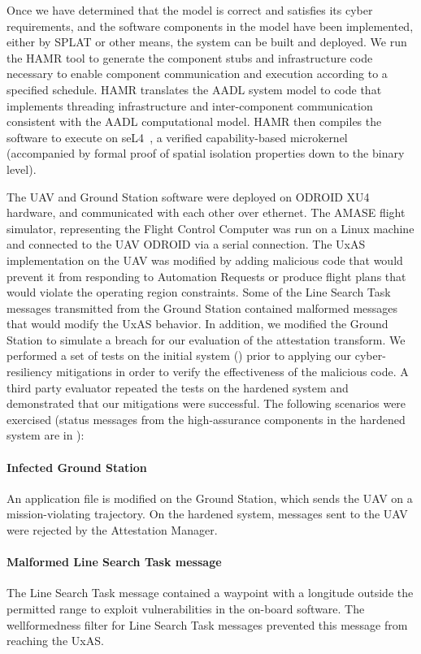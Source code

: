 Once we have determined that the model is correct and satisfies its cyber requirements, and the software components in the model have been implemented, either by SPLAT or other means, the system can be built and deployed.  We run the HAMR tool to generate the component stubs and infrastructure code necessary to enable component communication and execution according to a specified schedule.
HAMR translates the AADL system model to code that implements threading infrastructure and inter-component communication consistent with the AADL computational model.
%
HAMR then compiles the software to execute on seL4~\cite{sel4-2009}, a verified capability-based microkernel (accompanied by formal proof of spatial isolation properties down to the binary level).

The UAV and Ground Station software were deployed on ODROID XU4 hardware, and communicated with each other over ethernet.  The AMASE flight simulator, representing the Flight Control Computer was run on a Linux machine and connected to the UAV ODROID via a serial connection.  The UxAS implementation on the UAV was modified by adding malicious code that would prevent it from responding to Automation Requests or produce flight plans that would violate the operating region constraints.  Some of the Line Search Task messages transmitted from the Ground Station contained malformed messages that would modify the UxAS behavior. In addition, we modified the Ground Station to simulate a breach for our evaluation of the attestation transform.
%
We performed a set of tests on the initial system () prior to applying our cyber-resiliency mitigations in order to verify the effectiveness of the malicious code.  
A third party evaluator repeated the tests on the hardened system and %
demonstrated that our mitigations were successful.
The following scenarios were exercised (status messages from the high-assurance components in the hardened system are in ):

\paragraph{Infected Ground Station} An application file is modified on the Ground Station, which sends the UAV on a mission-violating trajectory.
On the hardened system, messages sent to the UAV were rejected by the Attestation Manager.  

\paragraph{Malformed Line Search Task message} The Line Search Task message contained a waypoint with a longitude outside the permitted range to exploit vulnerabilities in the on-board software.  The wellformedness filter for Line Search Task messages prevented this message from reaching the UxAS.

